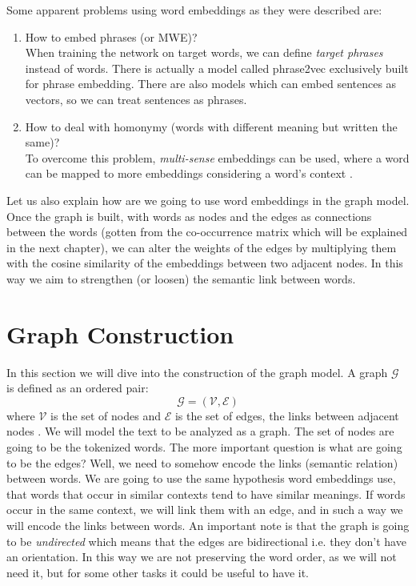 \documentclass[12pt]{article}
\numberwithin{equation}{section}
\begin{document}
\begin{spacing}{1.5}
	Some apparent problems using word embeddings as they were described are:
	\begin{enumerate}
		\item How to embed phrases (or MWE)?\\
		When training the network on target words, we can define \textit{target phrases} instead of words. There is actually a model called phrase2vec exclusively built for phrase embedding. There are also models which can embed sentences as vectors, so we can treat sentences as phrases.
		\item How to deal with homonymy (words with different meaning but written the same)? \\
		To overcome this problem, \textit{multi-sense} embeddings can be used, where a word can be mapped to more embeddings considering a word's context \cite{multi_sense_we}. 
	\end{enumerate}
	
	Let us also explain how are we going to use word embeddings in the graph model. Once the graph is built, with words as nodes and the edges as connections between the words (gotten from the co-occurrence matrix which will be explained in the next chapter), we can alter the weights of the edges by multiplying them with the cosine similarity of the embeddings between two adjacent nodes. In this way we aim to strengthen (or loosen) the semantic link between words.
	
	
	\newpage
	\section{Graph Construction}
	In this section we will dive into the construction of the graph model. A graph $\mathcal{G}$ is defined as an ordered pair:
	\begin{equation}
		\mathcal{G} = (\mathcal{V},\mathcal{E})
	\end{equation}
	where $\mathcal{V}$ is the set of nodes and $\mathcal{E}$ is the set of edges, the links between adjacent nodes \cite{juricGrafovi}. We will model the text to be analyzed as a graph. The set of nodes are going to be the tokenized words. The more important question is what are going to be the edges?
	Well, we need to somehow encode the links (semantic relation) between words. We are going to use the same hypothesis word embeddings use, that words that occur in similar contexts tend to have similar meanings. If words occur in the same context, we will link them with an edge, and in such a way we will encode the links between words. An important note is that the graph is going to be \textit{undirected} which means that the edges are bidirectional i.e. they don't have an orientation. In this way we are not preserving the word order, as we will not need it, but for some other tasks it could be useful to have it.
	

\end{spacing}
\end{document}
